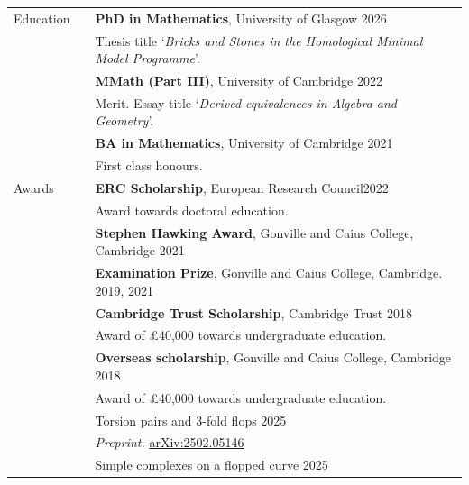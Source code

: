 \documentclass[10pt]{article}
\newcommand{\nextItem}{\\[0.25em]}
\newcommand{\nextSection}{\\[0.5em]}
\begin{document}
\begin{longtable}{>{\raggedleft\arraybackslash}p{0.82in}>{}p{0.05in}>{}p{5.5in}}
    Education%
     &  & \textbf{PhD in Mathematics}, University of Glasgow
    \hfill 2026                                                                            \\
     &  & Thesis title `\emph{Bricks and Stones in the Homological Minimal Model
                            Programme}'.
    \nextItem%
     &  & \textbf{MMath (Part III)},
    University of Cambridge
    \hfill 2022                                                                            \\
     &  & Merit. Essay title `\emph{Derived equivalences in Algebra and
                                  Geometry}'.
    \nextItem%
     &  & \textbf{BA in Mathematics},
    University of Cambridge
    \hfill 2021                                                                            \\
     &  & First class honours.
    \nextSection%
    Awards%
     &  & \textbf{ERC Scholarship}, European Research Council\hfill 2022                   \\
     &  & Award towards doctoral education.\nextItem                                       %
     &  & \textbf{Stephen Hawking Award}, Gonville and Caius College,
    Cambridge \hfill 2021\nextItem%
     &  & \textbf{Examination Prize}, Gonville and Caius College, Cambridge.
    \hfill 2019, 2021\nextItem%
     &  & \textbf{Cambridge Trust Scholarship}, Cambridge Trust \hfill 2018                \\
     &  & Award of £40,000 towards undergraduate education.\nextItem                       %
     &  & \textbf{Overseas scholarship}, Gonville and Caius College, Cambridge \hfill 2018 \\
     &  & Award of £40,000 towards undergraduate education.\nextSection                    %
    \multirow{2}{0.8in}{\raggedleft\arraybackslash Publications \& preprints}%
     &  & Torsion pairs and 3-fold flops \hfill 2025                                       \\
     &  & \emph{Preprint.}
    \href{https://arxiv.org/abs/2502.05146}{arXiv:2502.05146}
    \nextItem%
     &  & Simple complexes on a flopped curve \hfill 2025                                  \\

\end{longtable}
\end{document}
